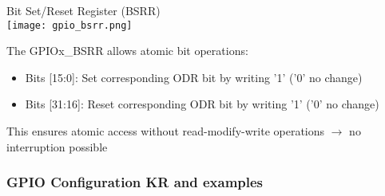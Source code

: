 \begin{concept}{Bit Set/Reset Register (BSRR)}\\
    \texttt{[image: gpio\_bsrr.png]}

The GPIOx\_BSRR allows atomic bit operations:
\begin{itemize}
    \item Bits [15:0]: Set corresponding ODR bit by writing '1' ('0' no change)
    \item Bits [31:16]: Reset corresponding ODR bit by writing '1' ('0' no change)
\end{itemize}
This ensures atomic access without read-modify-write operations $\rightarrow$ no interruption possible
\end{concept}


\columnbreak






\subsubsection{GPIO Configuration KR and examples}

